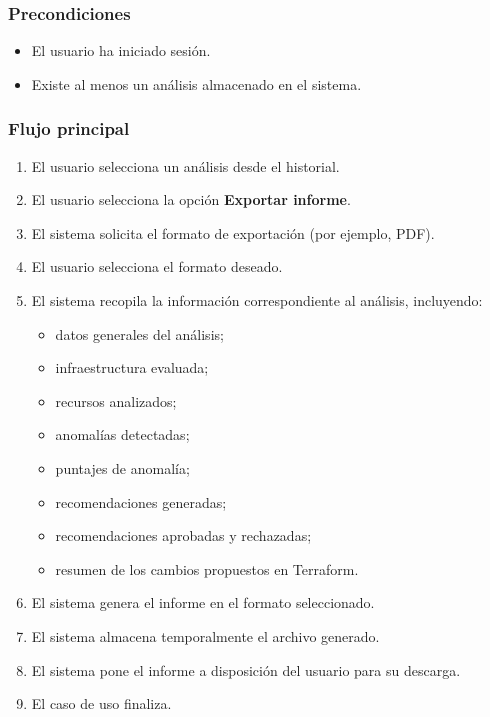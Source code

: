 \subsubsection*{Precondiciones}

\begin{itemize}
\item El usuario ha iniciado sesión.
\item Existe al menos un análisis almacenado en el sistema.
\end{itemize}

\subsubsection*{Flujo principal}

\begin{enumerate}
\item El usuario selecciona un análisis desde el historial.
\item El usuario selecciona la opción \textbf{Exportar informe}.
\item El sistema solicita el formato de exportación (por ejemplo, PDF).
\item El usuario selecciona el formato deseado.
\item El sistema recopila la información correspondiente al análisis, incluyendo:
  \begin{itemize}
  \item datos generales del análisis;
  \item infraestructura evaluada;
  \item recursos analizados;
  \item anomalías detectadas;
  \item puntajes de anomalía;
  \item recomendaciones generadas;
  \item recomendaciones aprobadas y rechazadas;
  \item resumen de los cambios propuestos en Terraform.
  \end{itemize}
\item El sistema genera el informe en el formato seleccionado.
\item El sistema almacena temporalmente el archivo generado.
\item El sistema pone el informe a disposición del usuario para su descarga.
\item El caso de uso finaliza.
\end{enumerate}

